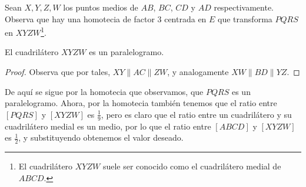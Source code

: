 Sean $X, Y, Z, W$ los puntos medios de $AB$, $BC$, $CD$ y $AD$ respectivamente. Observa que hay una homotecia de factor 3 centrada en $E$ que transforma $PQRS$ en $XYZW$\footnote{El cuadrilátero $XYZW$ suele ser conocido como el cuadrilátero medial de $ABCD$.}. 
\begin{lemma}
    El cuadrilátero $XYZW$ es un paralelogramo.\footnotemark
\end{lemma}
\begin{proof}
    Observa que por tales, $XY \parallel AC \parallel ZW$, y analogamente $XW \parallel BD \parallel YZ$.
    
\end{proof}
De aquí se sigue por la homotecia que observamos, que $PQRS$ es un paralelogramo. Ahora, por la homotecia también tenemos que el ratio entre $[PQRS]$ y $[XYZW]$ es $\frac{1}{9}$, pero es claro que el ratio entre un cuadrilátero y su cuadrilátero medial es un medio, por lo que el ratio entre $[ABCD]$ y $[XYZW]$ es $\frac{1}{2}$, y substituyendo obtenemos el valor deseado.
